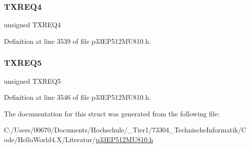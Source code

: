 \mbox{\label{structtag_c1_t_r45_c_o_n_b_i_t_s_adf240a43f250ec1a7e61ad9e8b9a8ffc}} 
\subsubsection{\texorpdfstring{T\+X\+R\+E\+Q4}{TXREQ4}}
{\footnotesize\ttfamily unsigned T\+X\+R\+E\+Q4}



Definition at line 3539 of file p33\+E\+P512\+M\+U810.\+h.

\mbox{\label{structtag_c1_t_r45_c_o_n_b_i_t_s_a9ad70609ad3034a380a9fa1ad06e7d17}} 
\subsubsection{\texorpdfstring{T\+X\+R\+E\+Q5}{TXREQ5}}
{\footnotesize\ttfamily unsigned T\+X\+R\+E\+Q5}



Definition at line 3546 of file p33\+E\+P512\+M\+U810.\+h.



The documentation for this struct was generated from the following file\+:\begin{DoxyCompactItemize}
\item 
C\+:/\+Users/00670/\+Documents/\+Hochschule/\+\_\+\+Tier1/73304\+\_\+\+Technische\+Informatik/\+Code/\+Hello\+World4.\+X/\+Literatur/\hyperlink{p33_e_p512_m_u810_8h}{p33\+E\+P512\+M\+U810.\+h}\end{DoxyCompactItemize}
